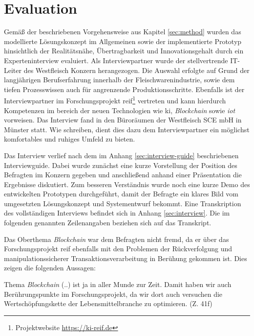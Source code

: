 \section{Evaluation} \label{sec:evaluation}
Gemäß der beschriebenen Vorgehensweise aus Kapitel \ref{sec:method} wurden das modellierte Lösungskonzept im Allgemeinen sowie der implementierte Prototyp hinsichtlich der Realitätsnähe, Übertragbarkeit und Innovationsgehalt durch ein Experteninterview evaluiert. Als Interviewpartner wurde der stellvertrende IT-Leiter des Westfleisch Konzern herangezogen. Die Auswahl erfolgte auf Grund der langjährigen Berufserfahrung innerhalb der Fleischwarenindustrie, sowie dem tiefen Prozesswissen auch für angrenzende Produktionsschritte. Ebenfalls ist der Interviewpartner im Forschungsprojekt \ac{reif}\footnote{Projektwebsite \url{https://ki-reif.de}} vertreten und kann hierdurch Kompetenzen im bereich der neuen Technologien wie \acf{ki}, \textit{Blockchain} sowie \textit{\acf{iot}} vorweisen. Das Interview fand in den Büroräumen der Westfleisch SCE mbH in Münster statt. Wie \citet{Ritchie2013} schreiben, dient dies dazu dem Interviewpartner ein möglichst komfortables und ruhiges Umfeld zu bieten.

Das Interview verlief nach dem im Anhang \ref{sec:interview-guide} beschriebenen Interviewguide. Dabei wurde zunächst eine kurze Vorstellung der Position des Befragten im Konzern gegeben und anschließend anhand einer Präsentation die Ergebnisse diskutiert. Zum besseren Verständnis wurde noch eine kurze Demo des entwickelten Prototypen durchgeführt, damit der Befragte ein klares Bild vom umgesetzten Lösungskonzept und Systementwurf bekommt. Eine Transkription des vollständigen Interviews befindet sich in Anhang \ref{sec:interview}. Die im folgenden genannten Zeilenangaben beziehen sich auf das Transkript.

Das Oberthema \textit{Blockchain} war dem Befragten nicht fremd, da er über das Forschungsprojekt \ac{reif} ebenfalls mit den Problemen der Rückverfolgung und manipulationssicherer Transaktionsverarbeitung in Berühung gekommen ist. Dies zeigen die folgenden Aussagen:

\begin{displayquote}
    \glqq Thema \textit{Blockchain} (..) ist ja in aller Munde zur Zeit. Damit haben wir auch Berührungspunkte im Forschungsprojekt, da wir dort auch versuchen die Wertschöpfungskette der Lebensmittelbranche zu optimieren.\grqq{} (Z. 41f)
\end{displayquote}

